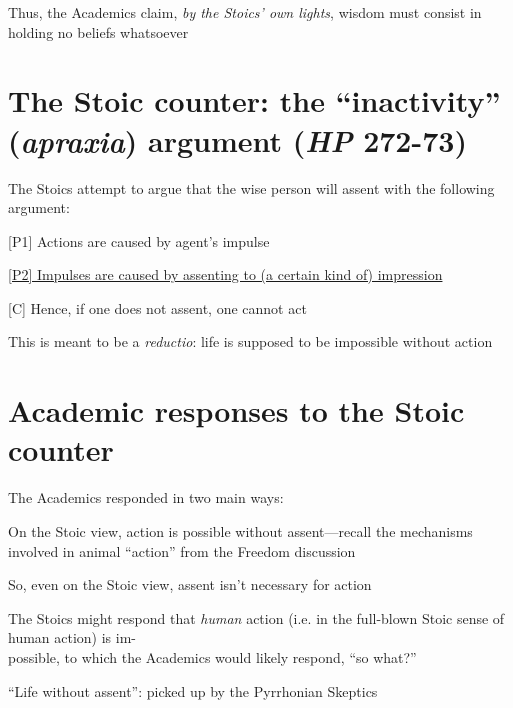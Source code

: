 \documentclass[11pt]{article}
\begin{document}
\noindent Thus, the Academics claim, \emph{by the Stoics' own lights}, wisdom must consist in holding no beliefs whatsoever

\section*{The Stoic counter: the ``inactivity'' (\emph{apraxia}) argument (\emph{HP} 272-73)}

\noindent The Stoics attempt to argue that the wise person will assent with the following argument:
\vspace*{2mm}

[P1] Actions are caused by agent's impulse
\vspace*{1mm}

\underline{[P2] Impulses are caused by assenting to (a certain kind of) impression}
\vspace*{1mm}

[C] Hence, if one does not assent, one cannot act
\vspace*{2mm}

\noindent This is meant to be a \emph{reductio}: life is supposed to be impossible without action

\section*{Academic responses to the Stoic counter}

\noindent The Academics responded in two main ways:
\vspace*{2mm}

\noindent [1] On the Stoic view, action is possible without assent---recall the mechanisms involved in animal ``action'' from the Freedom discussion
\vspace*{2mm}

So, even on the Stoic view, assent isn't necessary for action
\vspace*{1mm}

The Stoics might respond that \emph{human} action (i.e. in the full-blown Stoic sense of human action) is im-\\\hspace*{6mm}possible, to which the Academics would likely respond, ``so what?''
\vspace*{2mm}

\noindent [2] ``Life without assent'': picked up by the Pyrrhonian Skeptics
\end{document}
